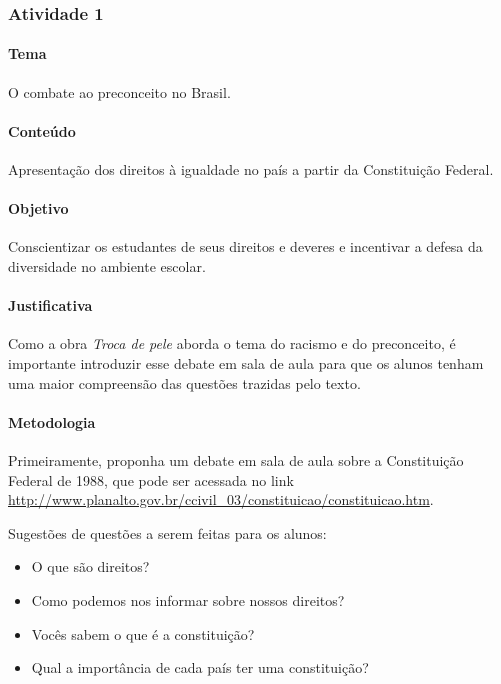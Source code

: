 \documentclass[11pt]{extarticle}
\begin{document}
\subsubsection{Atividade 1}

\paragraph{Tema} O combate ao preconceito no Brasil.

\paragraph{Conteúdo} Apresentação dos direitos à igualdade no país a partir da Constituição Federal.

\paragraph{Objetivo} Conscientizar os estudantes de seus direitos e deveres e incentivar a defesa da diversidade no ambiente escolar.

\paragraph{Justificativa} Como a obra \textit{Troca de pele} aborda o tema do racismo e do preconceito, é importante introduzir esse debate em sala de aula para que os alunos tenham uma maior compreensão das questões trazidas pelo texto.

\paragraph{Metodologia} Primeiramente, proponha um debate em sala de aula sobre a Constituição Federal de 1988, que pode ser acessada no link \url{http://www.planalto.gov.br/ccivil_03/constituicao/constituicao.htm}.

Sugestões de questões a serem feitas para os alunos:

\begin{itemize}

\item O que são direitos?

\item Como podemos nos informar sobre nossos direitos?

\item Vocês sabem o que é a constituição? 

\item Qual a importância de cada país ter uma constituição?

\end{itemize}
\end{document}

